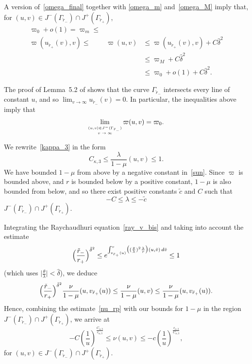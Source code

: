 \documentclass[a4paper,11pt,oneside,reqno]{amsart}
\newcommand{\ckrm}{\check r_-}
\newcommand{\ckrp}{\check r_+}
\begin{document}
A version of~\eqref{omega_final} together with \eqref{omega_m} and~\eqref{omega_M} imply that, for $(u,v)\in
J^-(\Gamma_{\ckrm})\cap J^+(\Gamma_{\ckrp})$,
\begin{eqnarray*}
\varpi_0+o(1)= \varpi_m\leq& &\\
\varpi(u_{\ckrp}(v),v)\leq&\varpi(u,v)&\leq\varpi(u_{\ckrp}(v),v)+C\hat{\delta}^2
\\
&&\leq\varpi_M+C\hat{\delta}^2\\
&&\leq\varpi_0+o(1)+C\hat{\delta}^2.
\end{eqnarray*}

The proof of Lemma~5.2 of \cite{relIst2} shows that the curve $\Gamma_{\ckrm}$
intersects every line of constant $u$, and so 
$\lim_{v\to\infty}u_{\ckrm}(v)=0$.
In particular, the inequalities above
imply that
\begin{equation}\label{lim_varpi}
\lim_{\stackrel{(u,v)\in{J^-(\Gamma_{\ckrm})}}{{\mbox{\tiny{$v\to\infty$}}}}}\varpi(u,v)=\varpi_0.
\end{equation}


We rewrite~\eqref{kappa_3} in the form
$$
C_{\kappa,3}\leq\frac{\lambda}{1-\mu}(u,v)\leq 1.
$$
We have bounded $1-\mu$ from above by a negative constant in~\eqref{sun}.
Since $\varpi$ is bounded above, and $r$ is bounded below by a positive constant, $1-\mu$ is also
bounded from below, and so there exist positive
constants $\tilde c$ and $C$ such that
\begin{equation}\label{tilde_c}
-C\leq\lambda\leq -\tilde c
\end{equation}
$J^-(\Gamma_{\ckrm})\cap J^+(\Gamma_{\ckrp})$.

Integrating the Raychaudhuri equation~\eqref{ray_v_bis}
and taking into account the estimate
\begin{equation}\label{perto_um}
\Bigl(\frac{\ckrm}{r_+}\Bigr)^{\hat\delta^2}\leq e^{\int_{v_{\ckrp}(u)}^v\bigl((\frac{\theta}{\lambda})^2\frac{\lambda}{r}\bigr)(u,\tilde v)\,d\tilde v}\leq 1
\end{equation}
(which uses $\bigl|\frac{\theta}{\lambda}\bigr|<\hat{\delta}$), we deduce
\begin{equation}\label{nu_mu}
\Bigl(\frac{\ckrm}{r_+}\Bigr)^{\hat\delta^2}\frac{\nu}{1-\mu}(u,v_{\ckrp}(u))
\leq
\frac{\nu}{1-\mu}(u,v)\leq\frac{\nu}{1-\mu}(u,v_{\ckrp}(u)).
\end{equation}
Hence, combining the estimate~\eqref{nu_rp} with our bounds for $1-\mu$ in the region
$J^-(\Gamma_{\ckrm})\cap J^+(\Gamma_{\ckrp})$,
we arrive at
\begin{equation}
\label{nu_rm}
-C\left(\frac{1}{u}\right)^{\frac{C_{\alpha,3}}{c_{\alpha,3}}}\leq
\nu(u,v)\leq-c\left(\frac{1}{u}\right)^{\frac{c_{\alpha,3}}{C_{\alpha,3}}},
\end{equation}
for $(u,v)\in J^-(\Gamma_{\ckrm})\cap J^+(\Gamma_{\ckrp})$.
\end{document}
